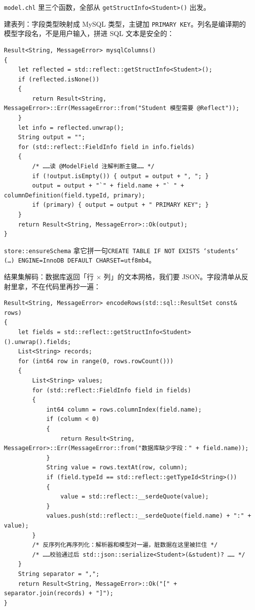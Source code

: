 \texttt{model.\allowbreak{}chl} 里三个函数，全部从 \texttt{get\allowbreak{}Struct\allowbreak{}Info<\allowbreak{}Student>\allowbreak{}(\allowbreak{})\allowbreak{}} 出发。

建表列：字段类型映射成 MySQL 类型，主键加 \texttt{PRIMARY KEY}。列名是编译期的模型字段名，不是用户输入，拼进 SQL 文本是安全的：

\par
\medskip
\begin{lstlisting}[style=chali]
Result<String, MessageError> mysqlColumns()
{
    let reflected = std::reflect::getStructInfo<Student>();
    if (reflected.isNone())
    {
        return Result<String, MessageError>::Err(MessageError::from("Student 模型需要 @Reflect"));
    }
    let info = reflected.unwrap();
    String output = "";
    for (std::reflect::FieldInfo field in info.fields)
    {
        /* ……读 @ModelField 注解判断主键…… */
        if (!output.isEmpty()) { output = output + ", "; }
        output = output + "`" + field.name + "` " + columnDefinition(field.typeId, primary);
        if (primary) { output = output + " PRIMARY KEY"; }
    }
    return Result<String, MessageError>::Ok(output);
}
\end{lstlisting}
\par
\medskip

\texttt{store:\allowbreak{}:\allowbreak{}ensure\allowbreak{}Schema} 拿它拼一句\texttt{CREATE TABLE IF NOT EXISTS `students` (\allowbreak{}…)\allowbreak{} ENGINE=\allowbreak{}Inno\allowbreak{}DB DEFAULT CHARSET=\allowbreak{}utf8mb4}。

结果集解码：数据库返回「行 \ensuremath{\times} 列」的文本网格，我们要 JSON。字段清单从反射里拿，不在代码里再抄一遍：

\par
\medskip
\begin{lstlisting}[style=chali]
Result<String, MessageError> encodeRows(std::sql::ResultSet const& rows)
{
    let fields = std::reflect::getStructInfo<Student>().unwrap().fields;
    List<String> records;
    for (int64 row in range(0, rows.rowCount()))
    {
        List<String> values;
        for (std::reflect::FieldInfo field in fields)
        {
            int64 column = rows.columnIndex(field.name);
            if (column < 0)
            {
                return Result<String, MessageError>::Err(MessageError::from("数据库缺少字段：" + field.name));
            }
            String value = rows.textAt(row, column);
            if (field.typeId == std::reflect::getTypeId<String>())
            {
                value = std::reflect::__serdeQuote(value);
            }
            values.push(std::reflect::__serdeQuote(field.name) + ":" + value);
        }
        /* 反序列化再序列化：解析器和模型对一遍，脏数据在这里被拦住 */
        /* ……校验通过后 std::json::serialize<Student>(&student)? …… */
    }
    String separator = ",";
    return Result<String, MessageError>::Ok("[" + separator.join(records) + "]");
}
\end{lstlisting}
\par
\medskip

